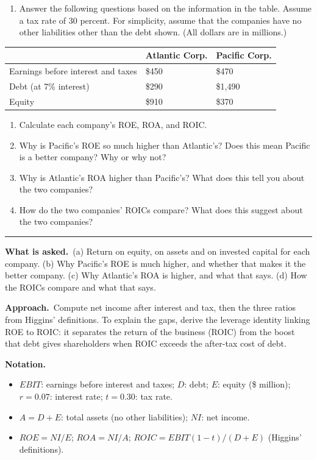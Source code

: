 \documentclass[11pt,a4paper]{article}
\newcommand{\notation}{\par\noindent\textbf{Notation.}}
\newcommand{\asked}{\par\medskip\noindent\textbf{What is asked.}~}
\newcommand{\approach}{\par\smallskip\noindent\textbf{Approach.}~}
\providecommand{\tightlist}{\setlength{\itemsep}{0pt}\setlength{\parskip}{0pt}}
\newcommand{\stmtend}{\par\endgroup\nopagebreak\noindent\rule{\linewidth}{0.4pt}\par\medskip}
\begin{document}
\begin{enumerate}
\def\labelenumi{\arabic{enumi}.}
\setcounter{enumi}{6}
\tightlist
\item
  Answer the following questions based on the information in the table. Assume a tax rate of 30
  percent. For simplicity, assume that the companies have no other liabilities other than the debt
  shown. (All dollars are in millions.)
\end{enumerate}

{\def\LTcaptype{none} %
\begin{longtable}[]{@{}lll@{}}
\toprule\noalign{}
& Atlantic Corp. & Pacific Corp. \\
\midrule\noalign{}
\endhead
\bottomrule\noalign{}
\endlastfoot
Earnings before interest and taxes & \$450 & \$470 \\
Debt (at 7\% interest) & \$290 & \$1,490 \\
Equity & \$910 & \$370 \\
\end{longtable}
}

\begin{enumerate}
\def\labelenumi{\alph{enumi}.}
\item
  Calculate each company's ROE, ROA, and ROIC.
\item
  Why is Pacific's ROE so much higher than Atlantic's? Does this mean Pacific is a better company?
  Why or why not?
\item
  Why is Atlantic's ROA higher than Pacific's? What does this tell you about the two companies?
\item
  How do the two companies' ROICs compare? What does this suggest about the two companies?
\end{enumerate}
\stmtend

\asked (a) Return on equity, on assets and on invested capital for each company. (b) Why Pacific's
ROE is much higher, and whether that makes it the better company. (c) Why Atlantic's ROA is
higher, and what that says. (d) How the ROICs compare and what that says.

\approach Compute net income after interest and tax, then the three ratios from Higgins'
definitions. To explain the gaps, derive the leverage identity linking ROE to ROIC: it separates
the return of the business (ROIC) from the boost that debt gives shareholders when ROIC exceeds the
after-tax cost of debt.

\notation
\begin{itemize}
  \item $EBIT$: earnings before interest and taxes; $D$: debt; $E$: equity (\$ million); $r = 0.07$:
        interest rate; $t = 0.30$: tax rate.
  \item $A = D + E$: total assets (no other liabilities); $NI$: net income.
  \item $ROE = NI/E$; $ROA = NI/A$; $ROIC = EBIT(1-t)/(D+E)$ (Higgins' definitions).
\end{itemize}
\end{document}
